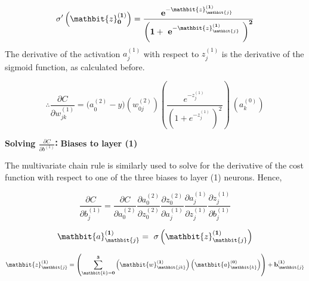 \documentclass[12pt,a4paper]{article}
\begin{document}
\begin{equation}
\mathbf{\sigma}^\prime\left(\mathbit{z}_\mathbf{0}^{\left(\mathbf{1}\right)}\right)=\frac{\mathbf{e}^{-\mathbit{z}_\mathbit{j}^{\left(\mathbf{1}\right)}\ }}{\left(\mathbf{1}+\ \mathbf{e}^{-\mathbit{z}_\mathbit{j}^{\left(\mathbf{1}\right)}\ }\right)^\mathbf{2}}
\end{equation}
The derivative of the activation $a_j^{\left(1\right)}$ with respect to $z_j^{\left(1\right)}$ is the derivative of the sigmoid function, as calculated before. 
	
	
\begin{equation}
\boxed{\therefore\frac{\partial C}{\partial w_{jk}^{\left(1\right)}}={(a}_0^{\left(2\right)}-y)(w_{0j}^{\left(2\right)})\left(\frac{e^{-z_j^{\left(1\right)}\ }}{\left(1+e^{-z_j^{\left(1\right)}\ }\right)^2}\right)\ (a_k^{\left(0\right)})}
\end{equation}

\hspace{}

\textbf{Solving $\frac{\partial C}{\partial b^{\left(1\right)}}$∶ Biases to layer (1)}

The multivariate chain rule is similarly used to solve for the derivative of the cost function with respect to one of the three biases to layer (1) neurons. Hence,

\begin{equation}
\frac{\partial C}{\partial b_j^{\left(1\right)}}=\frac{\partial C}{\partial a_0^{(2)}}\frac{\partial a_0^{(2)}}{\partial z_0^{\left(2\right)}}\frac{\partial z_0^{\left(2\right)}}{\partial a_j^{\left(1\right)}}\frac{\partial a_j^{\left(1\right)}}{\partial z_j^{\left(1\right)}}\frac{\partial z_j^{\left(1\right)}}{\partial b_j^{\left(1\right)}}
\end{equation}


\begin{equation}
\mathbit{a}_\mathbit{j}^{\left(\mathbf{1}\right)}=\ \mathbf{\sigma}\left(\mathbit{z}_\mathbit{j}^{\left(\mathbf{1}\right)}\right)
\end{equation}

\begin{equation}
\mathbit{z}_\mathbit{j}^{\left(\mathbf{1}\right)}=\left(\sum_{\mathbit{k}=\mathbf{0}}^{\mathbf{3}}\left(\mathbit{w}_{\mathbit{jk}}^{\left(\mathbf{1}\right)}\right)\left(\mathbit{a}_\mathbit{k}^{\left(\mathbf{0}\right)}\right)\right)+\mathbf{b}_\mathbit{j}^{\left(\mathbf{1}\right)}	
\end{equation}
\end{document}
